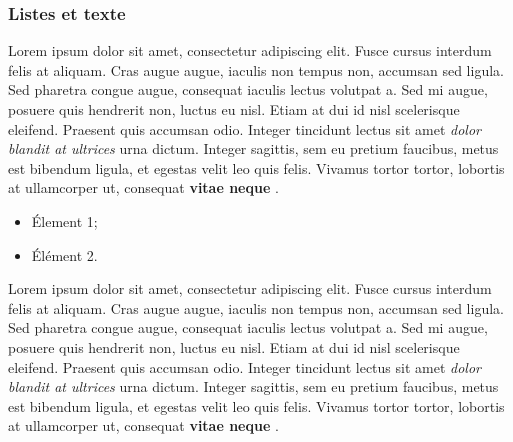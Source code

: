 \documentclass[a4paper,11pt]{report}
\begin{document}
 \subsubsection{Listes et texte} 

Lorem ipsum dolor sit amet, consectetur adipiscing elit. Fusce cursus interdum felis at aliquam. Cras augue augue, iaculis non tempus non, accumsan sed ligula. Sed pharetra congue augue, consequat iaculis lectus volutpat a. Sed mi augue, posuere quis hendrerit non, luctus eu nisl. Etiam at dui id nisl scelerisque eleifend. Praesent quis accumsan odio. Integer tincidunt lectus sit amet \emph{dolor blandit at ultrices} urna dictum. Integer sagittis, sem eu pretium faucibus, metus est bibendum ligula, et egestas velit leo quis felis. Vivamus tortor tortor, lobortis at ullamcorper ut, consequat \textbf{vitae neque} .

\begin{itemize}
\item Élement 1;
\item Élément 2.
\end{itemize}


Lorem ipsum dolor sit amet, consectetur adipiscing elit. Fusce cursus interdum felis at aliquam. Cras augue augue, iaculis non tempus non, accumsan sed ligula. Sed pharetra congue augue, consequat iaculis lectus volutpat a. Sed mi augue, posuere quis hendrerit non, luctus eu nisl. Etiam at dui id nisl scelerisque eleifend. Praesent quis accumsan odio. Integer tincidunt lectus sit amet \emph{dolor blandit at ultrices} urna dictum. Integer sagittis, sem eu pretium faucibus, metus est bibendum ligula, et egestas velit leo quis felis. Vivamus tortor tortor, lobortis at ullamcorper ut, consequat \textbf{vitae neque} .
\end{document}
